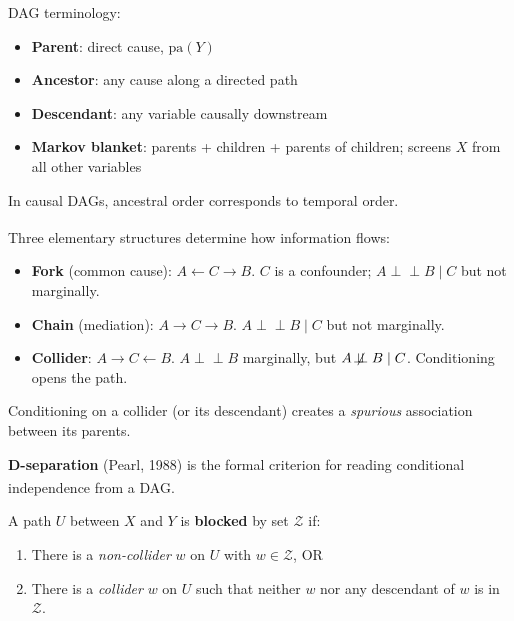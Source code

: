 \begin{tcbitemize}[ skin=sectionraster ]
    DAG terminology:
    \begin{itemize}
        \item \textbf{Parent}: direct cause, $\mathrm{pa}(Y)$
        \item \textbf{Ancestor}: any cause along a directed path
        \item \textbf{Descendant}: any variable causally downstream
        \item \textbf{Markov blanket}: parents + children + parents of children;
              screens $X$ from all other variables
    \end{itemize}

    In causal DAGs, ancestral order corresponds to temporal order.

    \tcbitem[title={Fork, Chain, and Collider}, raster multicolumn=3]
    Three elementary structures determine how information
    flows:\textsuperscript{\cite[][pp.~43--45]{barberBayesianReasoningMachine2012}}

    \begin{itemize}
        \item \textbf{Fork} (common cause): $A \leftarrow C \rightarrow B$.
              $C$ is a confounder; $A \perp\!\!\!\perp B \mid C$ but not marginally.
        \item \textbf{Chain} (mediation): $A \rightarrow C \rightarrow B$.
              $A \perp\!\!\!\perp B \mid C$ but not marginally.
        \item \textbf{Collider}: $A \rightarrow C \leftarrow B$.
              $A \perp\!\!\!\perp B$ marginally, but $A \not\!\perp\!\!\!\perp B \mid C$.
              Conditioning opens the path.
    \end{itemize}

    Conditioning on a collider (or its descendant) creates a \emph{spurious}
    association between its parents.

    \tcbitem[title=D-Separation, raster multicolumn=6]
    \textbf{D-separation} (Pearl, 1988) is the formal criterion for reading
    conditional independence from a
    DAG.\textsuperscript{\cite[][pp.~45--46]{barberBayesianReasoningMachine2012}}

    A path $U$ between $X$ and $Y$ is \textbf{blocked} by set $\mathcal{Z}$ if:
    \begin{enumerate}
        \item There is a \emph{non-collider} $w$ on $U$ with $w \in \mathcal{Z}$, OR
        \item There is a \emph{collider} $w$ on $U$ such that neither $w$ nor
              any descendant of $w$ is in $\mathcal{Z}$.
    \end{enumerate}


\end{tcbitemize}
